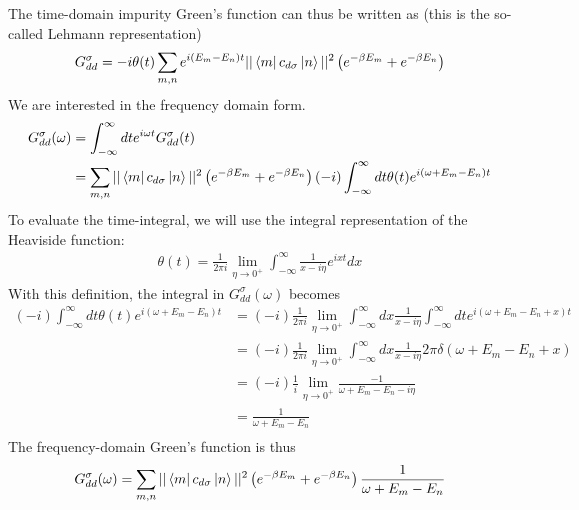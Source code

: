 \documentclass[twoside]{report}
\numberwithin{equation}{section}
\begin{document}
The time-domain impurity Green's function can thus be written as (this is the so-called Lehmann representation)
\begin{equation}\begin{aligned}
	G_{dd}^\sigma = -i\theta(t)\sum_{m,n}e^{i\left( E_m - E_n \right)  t}||\bra{m}c_{d\sigma}\ket{n}||^2\left( e^{-\beta E_m} + e^{-\beta E_n}\right)\\
\end{aligned}\end{equation}
We are interested in the frequency domain form.
\begin{equation}\begin{aligned}
	G_{d d}^\sigma(\omega) &= \int_{-\infty}^\infty dt e^{i \omega t}G_{d d}^\sigma(t) \\
			       &= \sum_{m,n}||\bra{m}c_{d\sigma}\ket{n}||^2\left( e^{-\beta E_m} + e^{-\beta E_n}\right)\left(-i\right)\int_{-\infty}^\infty dt \theta(t)e^{i\left( \omega + E_m - E_n \right)t}
\end{aligned}\end{equation}
To evaluate the time-integral, we will use the integral representation of the Heaviside function:
\begin{equation}\begin{aligned}
	\theta(t) = \frac{1}{2\pi i}\lim_{\eta \to 0^+} \int_{-\infty}^\infty \frac{1}{x- i\eta}e^{ixt}dx
\end{aligned}\end{equation}
With this definition, the integral in \(G_{dd}^\sigma(\omega)\) becomes
\begin{equation}\begin{aligned}
	\left(-i\right)\int_{-\infty}^\infty dt \theta(t)e^{i\left( \omega + E_m - E_n \right)t} &= \left(-i\right)\frac{1}{2\pi i}\lim_{\eta \to 0^+} \int_{-\infty}^\infty dx\frac{1}{x- i\eta}\int_{-\infty}^\infty dt e^{i\left( \omega + E_m - E_n + x\right)t} \\
									     &=\left(-i\right)\frac{1}{2\pi i}\lim_{\eta \to 0^+} \int_{-\infty}^\infty dx\frac{1}{x- i\eta} 2\pi \delta\left( \omega + E_m - E_n + x\right) \\
									     &=\left(-i\right)\frac{1}{i}\lim_{\eta \to 0^+} \frac{-1}{\omega + E_m - E_n- i\eta} \\
									     &=\frac{1}{\omega + E_m - E_n} \\
\end{aligned}\end{equation}
The frequency-domain Green's function is thus
\begin{equation}\begin{aligned}
	G_{d d}^\sigma(\omega) = \sum_{m,n}||\bra{m}c_{d\sigma}\ket{n}||^2\left( e^{-\beta E_m} + e^{-\beta E_n}\right)\frac{1}{\omega + E_m - E_n}
\end{aligned}\end{equation}
\end{document}
